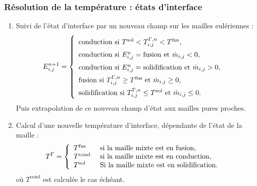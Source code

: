 \documentclass{beamer}
\newcommand{\inte}{\Gamma}
\newcommand{\fus}{\text{fus}}
\newcommand{\sol}{\text{sol}}
\newcommand{\cond}{\text{cond}}
\newcommand{\npl}{{n+1}}
\begin{document}
\begin{frame}
    \frametitle{Résolution de la température : états d'interface}
   	\footnotesize
\begin{enumerate}
	\item Suivi de l'état d'interface par un nouveau champ sur les mailles eulériennes :
\begin{align}
\label{eq:etatn2}
E_{i,j}^\npl &=\left\{ {\renewcommand{\arraystretch}{1.5}\begin{array}{l} 
\text{conduction} \text{ si } T^\sol < T^{\Gamma,n}_{i,j} <T^\fus,\\
\text{conduction} \text{ si } E_{i,j}^n = \text{fusion} \text{ et } \dot{m}_{i,j}<0,\\
\text{conduction} \text{ si } E_{i,j}^n = \text{solidification} \text{ et } \dot{m}_{i,j}>0,\\
\text{fusion} \text{ si } T^{\Gamma,n}_{i,j} \geq T^\fus \text{ et } \dot{m}_{i,j} \geq 0,\\
\text{solidification} \text{ si } T^{\Gamma,n}_{i,j} \leq T^\sol \text{ et } \dot{m}_{i,j} \leq 0.
 \end{array}}\right.
\end{align}
Puis extrapolation de ce nouveau champ d'état aux mailles pures proches.
\item Calcul d'une nouvelle température d'interface, dépendante de l'état de la maille :
\begin{align}
	T^{\inte} &= \left\{ {\renewcommand{\arraystretch}{1.}\begin{array}{l l l} 
		T^\fus & \text{ si la maille mixte est en fusion},\\
		T^{\text{cond}} & \text{  si la maille mixte est en  conduction},\\
		T^\sol & \text{ Si la maille mixte est en solidification}.
 \end{array}}\right.
\end{align} 
où $T^{\cond}$ est calculée le cas échéant.




\end{enumerate}
\end{frame}
\end{document}
